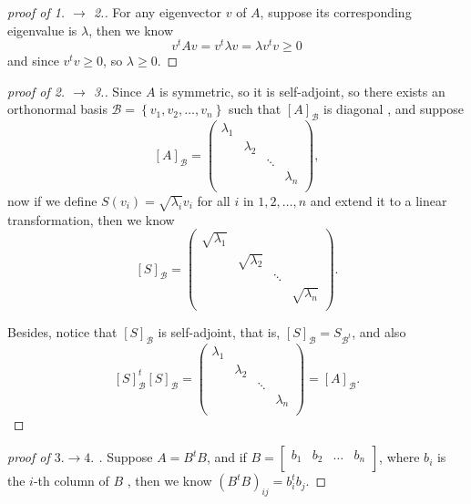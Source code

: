 \begin{proof}[proof of 1. \(\to \) 2.]
    For any eigenvector \(v\)  of \(A\), suppose its corresponding eigenvalue is \(\lambda \), then we know 
    \[
      v^t A v = v^t \lambda v = \lambda v^t v \ge 0
    \] and since \(v^t v \ge 0\), so \(\lambda  \ge 0\). 
\end{proof}

\begin{proof}[proof of 2. \(\to\) 3.]
Since \(A\) is symmetric, so it is self-adjoint, so there exists an orthonormal basis \(\mathcal{B} = \left\{ v_1,v_2, \dots ,v_n \right\}  \) such that \([A]_\mathcal{B} \) is diagonal  , and suppose 
    \[
      [A]_\mathcal{B}  = \begin{pmatrix}
        \lambda _1 &  &  &   \\
         & \lambda _2  &  &   \\
         &  & \ddots &   \\
         &  &  & \lambda _n  \\
      \end{pmatrix},
    \]
  now if we define \(S(v_i) = \sqrt{\lambda _i} v_i \) for all \(i\) in \(1,2, \dots ,n\) and extend it to a linear transformation, then we know
  \[
    [S]_\mathcal{B} = \begin{pmatrix}
      \sqrt{\lambda _1}  &  &  &   \\
       &\sqrt{\lambda _2}   &  &   \\
       &  &\ddots   &   \\
       &  &  &\sqrt{\lambda _n}    \\
    \end{pmatrix}.
  \] 
  
  Besides, notice that \([S]_\mathcal{B} \) is self-adjoint, that is, \([S]_\mathcal{B} = S_{\mathcal{B} ^t} \), and also 
  \[
    [S]_\mathcal{B} ^t [S]_\mathcal{B} = \begin{pmatrix}
        \lambda _1 &  &  &   \\
         & \lambda _2  &  &   \\
         &  & \ddots &   \\
         &  &  & \lambda _n  \\
      \end{pmatrix} = [A]_\mathcal{B} . 
  \]  
\end{proof}
\begin{proof}[proof of \(3. \to 4.\) ]
  Suppose \(A = B^t B\), and if \(B = \begin{bmatrix}
    b_1 &b_2  &\dots   &b_n   \\
  \end{bmatrix}\), where \(b_i\) is the \(i\)-th column of \(B\)    , then we know \(\left( B^t B\right)_{ij} = b_i^t b_j  \). 
\end{proof}
